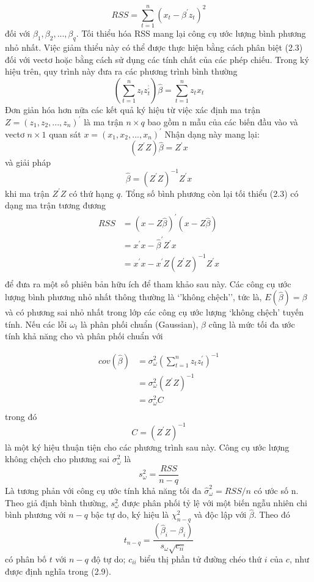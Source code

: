 \documentclass[12pt, a4paper,oneside]{book}
\theoremstyle{definition}
\begin{document}
$$ RSS = \sum_{t=1}^{n} (x_{t}- \beta ^{'}z_{t})^{2} $$
đối với $\beta_{1},\beta_{2},...,\beta_{q}$. Tối thiểu hóa RSS mang lại công cụ ước lượng bình phương nhỏ nhất. Việc giảm thiểu này có thể được thực hiện bằng cách phân biệt (2.3) đối với vectơ hoặc bằng cách sử dụng các tính chất của các phép chiếu. Trong ký hiệu trên, quy trình này đưa ra các phương trình bình thường
$$(\sum_{t=1}^{n} z_{t}z_{t}^{;})\hat{\beta}= \sum_{t=1}^{n} z_{t} x_{t}$$
Đơn giản hóa hơn nữa các kết quả ký hiệu từ việc xác định ma trận 
$Z=(z_{1},z_{2},...,z_{n})^{'}$ là ma trận $n\times q$ bao gồm n mẫu của các biến đầu vào và vectơ $n \times 1$ quan sát $x=(x_{1},x_{2},...,x_{n})^{'}$ Nhận dạng này mang lại:
$$(Z^{'}Z)\hat{\beta}=Z^{'}x$$
và giải pháp
$$\hat{\beta}=(Z^{'}Z)^{-1}Z^{'}x$$
khi ma trận $ Z^{'}Z $ có thứ hạng $ q $. Tổng số bình phương còn lại tối thiểu (2.3) có dạng ma trận tương đương
\begin{align*}
RSS&=(x-Z\hat{\beta})^{'}(x-Z\hat{\beta})\\
&=x^{'}x-\hat{\beta}^{'}Z^{'}x\\
&=x^{'}x-x^{'}Z(Z^{'}Z)^{-1}Z^{'}x\\
\end{align*}
để đưa ra một số phiên bản hữu ích để tham khảo sau này. Các công cụ ước lượng bình phương nhỏ nhất thông thường là ‘’không chệch’’, tức là, $E(\hat{\beta})=\beta$ và có phương sai nhỏ nhất trong lớp các công cụ ước lượng ‘không chệch’ tuyến tính. Nếu các lỗi $ \omega_{t} $ là phân phối chuẩn (Gaussian), $ \beta $ cũng là mức tối đa ước tính khả năng cho và phân phối chuẩn với

\begin{align*}
cov(\hat{\beta})&=\sigma_{\omega}^{2}(\sum_{t=1}^{n} z_{t}z_{t}^{'})^{-1}\\
&=\sigma_{\omega}^{2}(Z^{'}Z)^{-1}\\
&=\sigma_{\omega}^{2}C\\
\end{align*}
trong đó	$$C=(Z^{'}Z)^{-1}$$
là một ký hiệu thuận tiện cho các phương trình sau này. Công cụ ước lượng không chệch cho phương sai $ \sigma_{\omega}^{2} $ là
$$s_{\omega}^{2}=\dfrac{RSS}{n-q}$$
Là tương phản với công cụ ước tính khả năng tối đa $\hat{\sigma}_{\omega}^{2}=RSS/n$ có ước số n. Theo giả định bình thường, $ s_{\omega}^{2} $ được phân phối tỷ lệ với một biến ngẫu nhiên chi bình phương với $ n - q $ bậc tự do, ký hiệu là $ \chi_{n-q}^{2} $ và độc lập với $ \hat{\beta} $. Theo đó
$$t_{n-q}=\dfrac{(\hat{\beta}_{i}-\beta_{i})}{s_{\omega}\sqrt{c_{ii}}}$$
có phân bố $ t $ với $ n − q $ độ tự do; $ c_{ii} $ biểu thị phần tử đường chéo thứ $ i $ của $ c $, như được định nghĩa trong (2.9).
\end{document}
